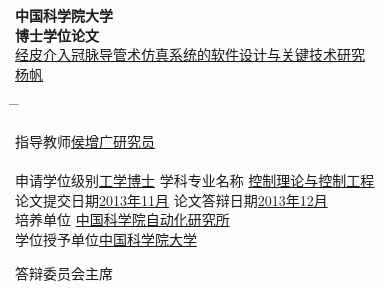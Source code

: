\vspace*{1.7cm} %
\begin{center}
{\Huge \song \textbf{中国科学院大学}}\\
\vspace{0.8cm} {\Huge \song \textbf{博士学位论文}}\\
\vspace{1.8cm}
{\xiaoerhao \song \underline{经皮介入冠脉导管术仿真系统的软件设计与关键技术研究}}\\
\vspace{1.1cm} {\sanhao \underline{\;杨\;\;\;\;帆\;}}\\
\end{center}
\sanhao \vspace{1.2cm}
\begin{tabbing}
\hspace*{-0.8cm} \= \hspace{6.4cm} \= \kill

\>指导教师\underline{\hspace{4.8cm}侯增广\;\;研究员\hspace{4.6cm}}\\

\>\hspace{2.0cm} \underline{\hspace{13.1cm}}\\

\>申请学位级别\underline{\hspace{0.5cm}工学博士\hspace{0.5cm}} \>学科专业名称 \underline{\hspace{0.2cm}控制理论与控制工程\hspace{0.2cm}}\\

\>论文提交日期\underline{\hspace{0.3cm}2013年11月\hspace{0.3cm}} \> 论文答辩日期\underline{\hspace{1.4cm}2013年12月\hspace{1.4cm}}\\

\>培养单位 \underline{\hspace{3.5cm}中国科学院自动化研究所 \hspace{3.5cm}} \\

\>学位授予单位\underline{\hspace{3.5cm}中国科学院大学 \hspace{4.6cm}} \\
\end{tabbing}
\vspace{0.5cm}
\hspace*{7.1cm}答辩委员会主席\underline{\hspace{3.4cm}}
